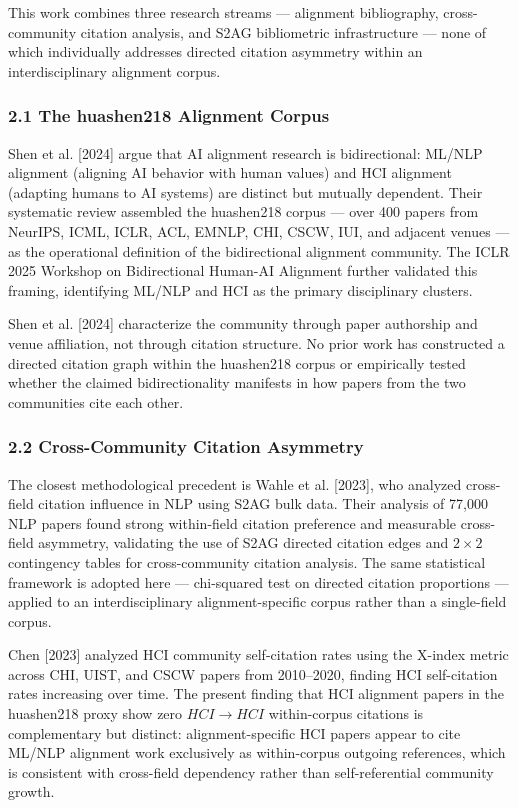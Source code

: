 
This work combines three research streams --- alignment bibliography, cross-community citation analysis, and S2AG bibliometric infrastructure --- none of which individually addresses directed citation asymmetry within an interdisciplinary alignment corpus.

\subsubsection{2.1 The huashen218 Alignment Corpus}

Shen et al. [2024] argue that AI alignment research is bidirectional: ML/NLP alignment (aligning AI behavior with human values) and HCI alignment (adapting humans to AI systems) are distinct but mutually dependent. Their systematic review assembled the huashen218 corpus --- over 400 papers from NeurIPS, ICML, ICLR, ACL, EMNLP, CHI, CSCW, IUI, and adjacent venues --- as the operational definition of the bidirectional alignment community. The ICLR 2025 Workshop on Bidirectional Human-AI Alignment further validated this framing, identifying ML/NLP and HCI as the primary disciplinary clusters.

Shen et al. [2024] characterize the community through paper authorship and venue affiliation, not through citation structure. No prior work has constructed a directed citation graph within the huashen218 corpus or empirically tested whether the claimed bidirectionality manifests in how papers from the two communities cite each other.

\subsubsection{2.2 Cross-Community Citation Asymmetry}

The closest methodological precedent is Wahle et al. [2023], who analyzed cross-field citation influence in NLP using S2AG bulk data. Their analysis of 77,000 NLP papers found strong within-field citation preference and measurable cross-field asymmetry, validating the use of S2AG directed citation edges and $2\times 2$ contingency tables for cross-community citation analysis. The same statistical framework is adopted here --- chi-squared test on directed citation proportions --- applied to an interdisciplinary alignment-specific corpus rather than a single-field corpus.

Chen [2023] analyzed HCI community self-citation rates using the X-index metric across CHI, UIST, and CSCW papers from 2010--2020, finding HCI self-citation rates increasing over time. The present finding that HCI alignment papers in the huashen218 proxy show zero $HCI\rightarrow HCI$ within-corpus citations is complementary but distinct: alignment-specific HCI papers appear to cite ML/NLP alignment work exclusively as within-corpus outgoing references, which is consistent with cross-field dependency rather than self-referential community growth.

